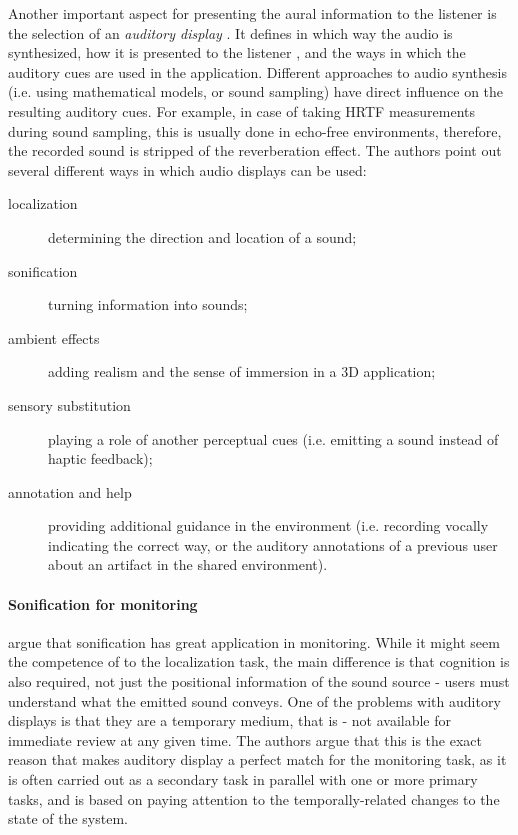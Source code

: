 Another important aspect for presenting the aural information to the listener is the selection of an \textit{auditory display} \cite[p.~153]{jr_3d_2017}. It defines in which way the audio is synthesized, how it is presented to the listener %
, and the ways in which the auditory cues are used in the application.
Different approaches to audio synthesis (i.e. using mathematical models, or sound sampling) have direct influence on the resulting auditory cues. For example, in case of taking HRTF measurements during sound sampling, this is usually done in echo-free environments, therefore, the recorded sound is stripped of the reverberation effect.
The authors point out several different ways in which audio displays can be used:
\begin{description}
	\item[localization] determining the direction and location of a sound;
	\item[sonification] turning information into sounds;
	\item[ambient effects] adding realism and the sense of immersion in a 3D application;
	\item[sensory substitution] playing a role of another perceptual cues (i.e. emitting a sound instead of haptic feedback); 
	\item[annotation and help] providing additional guidance in the environment (i.e. recording vocally indicating the correct way, or the auditory annotations of a previous user about an artifact in the shared environment).
\end{description}

\paragraph[]{Sonification for monitoring}
\cite{hermann_sonification_2011} argue that sonification has great application in monitoring. While it might seem the competence of to the localization task, the main difference is that cognition is also required, not just the positional information of the sound source - users must understand what the emitted sound conveys.
One of the problems with auditory displays is that they are a temporary medium, that is - not available for immediate review at any given time. The authors argue that this is the exact reason that makes auditory display a perfect match for the monitoring task, as it is often carried out as a secondary task in parallel with one or more primary tasks, and is based on paying attention to the temporally-related changes to the state of the system.

